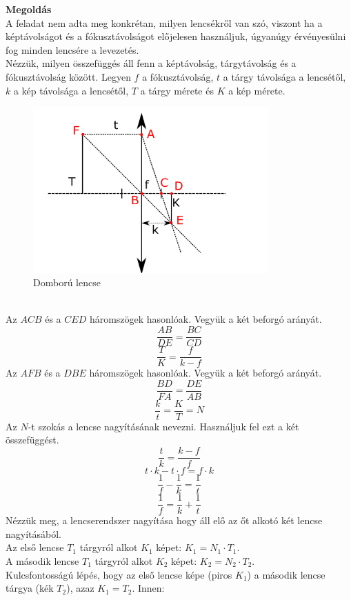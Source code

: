 \documentclass[11pt,a4paper,openany,leqno]{article}
\begin{document}
\textbf{Megoldás}\\
\indent
A feladat nem adta meg konkrétan, milyen lencsékről van szó, viszont ha a képtávolságot és a fókusztávolságot előjelesen használjuk, úgyanúgy érvényesülni fog minden lencsére a levezetés.\\ \indent
Nézzük, milyen összefüggés áll fenn a képtávolság, tárgytávolság és a fókusztávolság között. Legyen $f$ a fókusztávolság, $t$ a tárgy távolsága a lencsétől, $k$ a kép távolsága a lencsétől, $T$ a tárgy mérete és $K$ a kép mérete.\\
\begin{figure}[h!]
\centering
  \includegraphics[width=90mm, scale=0.5]{kep21.pdf}
  \caption{Domború lencse}
  \label{}
\end{figure}\\ 
\indent
Az $ACB$ és a $CED$ háromszögek hasonlóak. Vegyük a két beforgó arányát.\\
$$ \frac{AB}{DE} = \frac{BC}{CD} $$
$$ \frac{T}{K} = \frac{f}{k-f} $$\indent
Az $AFB$ és a $DBE$ háromszögek hasonlóak. Vegyük a két beforgó arányát.\\
$$ \frac{BD}{FA} = \frac{DE}{AB} $$
$$ \frac{k}{t} = \frac{K}{T} = N$$\indent
Az $N$-t szokás a lencse nagyításának nevezni. Használjuk fel ezt a két összefüggést.\\
$$ \frac{t}{k} = \frac{k-f}{f} $$
$$ t\cdot k - t\cdot f = f\cdot k $$
$$ \frac{1}{f} - \frac{1}{k} = \frac{1}{t} $$
$$ \frac{1}{f} = \frac{1}{k} + \frac{1}{t} $$\indent
Nézzük meg, a lencserendszer nagyítása hogy áll elő az őt alkotó két lencse nagyításából.\\ \indent
Az első lencse $T_1$ tárgyról alkot $K_1$ képet: $K_1 = N_1 \cdot T_1$.\\ \indent
A második lencse $T_1$ tárgyról alkot $K_2$ képet: $K_2 = N_2 \cdot T_2$. \\ \indent
Kulcsfontosságú lépés, hogy az első lencse képe (piros $K_1$) a második lencse tárgya (kék $T_2$), azaz $K_1 = T_2$. Innen:\\
\end{document}
